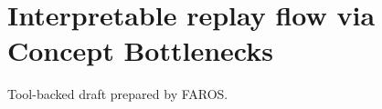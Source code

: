 \documentclass{article}
\begin{document}
\section*{Interpretable replay flow via Concept Bottlenecks}
Tool-backed draft prepared by FAROS.
\end{document}
